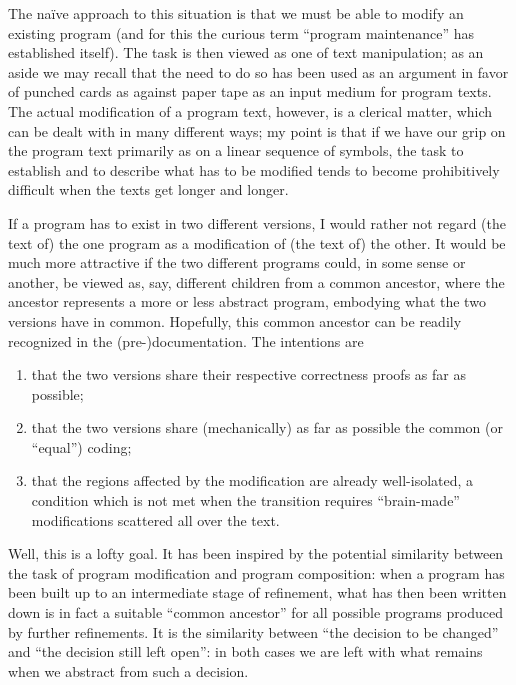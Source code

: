 \documentclass[twoside,11pt]{book}
\begin{document}
The naïve approach to this situation is that we must be able to modify an existing program (and for this the curious term ``program maintenance'' has established itself). The task is then viewed as one of text manipulation; as an aside we may recall that the need to do so has been used as an argument in favor of punched cards as against paper tape as an input medium for program texts. The actual modification of a program text, however, is a clerical matter, which can be dealt with in many different ways; my point is that if we have our grip on the program text  primarily as on a linear sequence of symbols, the task to establish and to describe what has to be modified tends to become prohibitively difficult when the texts get longer and longer.

If a program has to exist in two different versions, I would rather not regard (the text of) the one program as a modification of (the text of) the other. It would be much more attractive if the two different programs could, in some sense or another, be viewed as, say, different children from a common ancestor, where the ancestor represents a more or less abstract program, embodying what the two versions have in common. Hopefully, this common ancestor can be readily recognized in the (pre-)documentation. The intentions are

\begin{enumerate}[wide, nosep, label=(\arabic*)]
	\item that the two versions share their respective correctness proofs as far as possible;

	\item that the two versions share (mechanically) as far as possible the common (or ``equal'') coding;

	\item that the regions affected by the modification are already well-isolated, a condition which is not met when the transition requires ``brain-made'' modifications scattered all over the text.
\end{enumerate}

Well, this is a lofty goal. It has been inspired by the potential similarity between the task of program modification and program composition: when a program has been built up to an intermediate stage of refinement, what has then been written down is in fact a suitable ``common ancestor'' for all possible programs produced by further refinements. It is the similarity between ``the decision to be changed'' and ``the decision still left open'': in both cases we are left with what remains when we abstract from such a decision.
\end{document}
